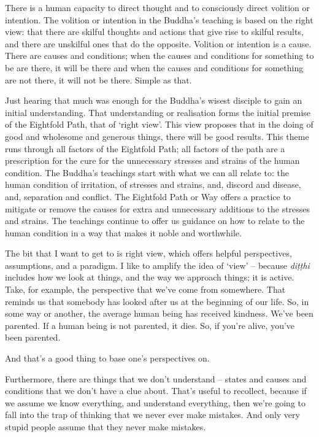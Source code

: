 \bigskip

There is a human capacity to direct thought and to consciously direct volition
or intention. The volition or intention in the Buddha's teaching is based on the
right view: that there are skilful thoughts and actions that give rise to
skilful results, and there are unskilful ones that do the opposite. Volition or
intention is a cause. There are causes and conditions; when the causes and
conditions for something to be are there, it will be there and when the causes
and conditions for something are not there, it will not be there. Simple as that.

\enlargethispage*{\baselineskip}

Just hearing that much was enough for the Buddha's wisest disciple to gain an
initial understanding. That understanding or realisation forms the initial
premise of the Eightfold Path, that of `right view'. This view proposes that in
the doing of good and wholesome and generous things, there will be good results.
This theme runs through all factors of the Eightfold Path; all factors of the
path are a prescription for the cure for the unnecessary stresses and strains of
the human condition. The Buddha's teachings start with what we can
all relate to: the human condition of irritation, of stresses and strains, and,
discord and disease, and, separation and conflict. The Eightfold Path or Way
offers a practice to mitigate or remove the causes for extra and unnecessary
additions to the stresses and strains. The teachings continue to offer
us guidance on how to relate to the human condition in a way that makes it
noble and worthwhile.

The bit that I want to get to is right view, which offers helpful perspectives,
assumptions, and a paradigm. I like to amplify the idea of `view' -- because
\emph{diṭṭhi} includes how we look at things, and the way we approach things; it
is active. Take, for example, the perspective that we've come from somewhere.
That reminds us that somebody has looked after us at the beginning of our life.
So, in some way or another, the average human being has received kindness. We've
been parented. If a human being is not parented, it dies. So, if you're alive,
you've been parented.

And that's a good thing to base one's perspectives on.

Furthermore, there are things that we don't understand -- states and causes and
conditions that we don't have a clue about. That's useful to recollect, because
if we assume we know everything, and understand everything, then we're going to
fall into the trap of thinking that we never ever make mistakes. And only very
stupid people assume that they never make mistakes.

